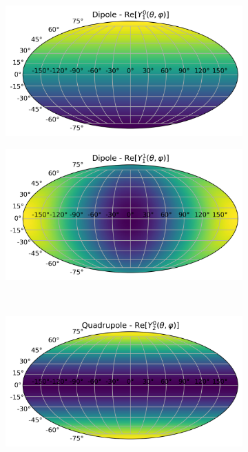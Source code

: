 \documentclass[a4paper,12pt]{report}
\begin{document}
\begin{figure}[t]
  \centering
  \begin{subfigure}[b]{0.3\textwidth}
    \includegraphics[width=\textwidth]{Sph Harm Examples/dipole Y01.png}
    \caption{}
    \label{subfig: dipole example 01}
  \end{subfigure}
  \begin{subfigure}[b]{0.3\textwidth}
    \includegraphics[width=\textwidth]{Sph Harm Examples/dipole Y11 Re.png}
    \caption{}
    \label{subfig: dipole example 11}
  \end{subfigure}
  \\
  \begin{subfigure}[b]{0.3\textwidth}
    \includegraphics[width=\textwidth]{Sph Harm Examples/Quadrupole Y02.png}

\end{subfigure}
\end{figure}
\end{document}
